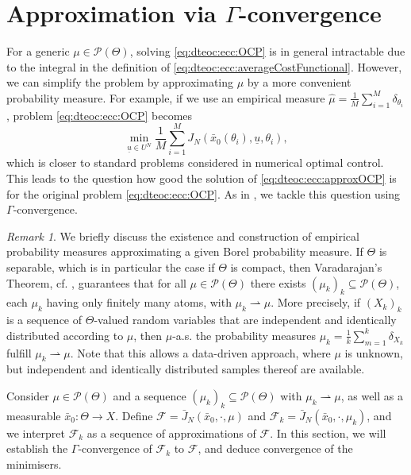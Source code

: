 \documentclass[letterpaper, 10 pt, conference]{IEEEconf}  %
\newcommand{\Pbs}{\mathcal{P}} %
\newcommand{\weak}{\rightharpoonup} %
\newcommand{\es}{\bar{x}} %
\newcommand{\is}[1]{{\underline{#1}}} %
\theoremstyle{theorem}
\theoremstyle{definition}
\theoremstyle{remark}
\newtheorem{remark}{Remark}
\begin{document}
\section{Approximation via $\Gamma$-convergence} \label{sec:ecc:gammaConv}
For a generic $\mu\in\Pbs(\Theta)$, solving \eqref{eq:dteoc:ecc:OCP} is in general intractable due to the integral in the definition of \eqref{eq:dteoc:ecc:averageCostFunctional}.
However, we can simplify the problem by approximating $\mu$ by a more convenient probability measure.
For example, if we use an empirical measure $\hat\mu=\frac1M \sum_{i=1}^M \delta_{\theta_i}$,
problem \eqref{eq:dteoc:ecc:OCP} becomes
\begin{equation} \label{eq:dteoc:ecc:approxOCP}
    \min_{\is{u}\in U^N} \frac1M \sum_{i=1}^M J_N(\es_0(\theta_i),\is{u},\theta_i),
\end{equation}
which is closer to standard problems considered in numerical optimal control.
This leads to the question how good the solution of \eqref{eq:dteoc:ecc:approxOCP} is for the original problem \eqref{eq:dteoc:ecc:OCP}.
As in \cite{scagliotti2023optimal}, we tackle this question using $\Gamma$-convergence.
\begin{remark}
We briefly discuss the existence and construction of empirical probability measures approximating a given Borel probability measure.
If $\Theta$ is separable, which is in particular the case if $\Theta$ is compact, then Varadarajan's Theorem, cf. \cite[Theorem~11.4.1]{dudley2002real}, guarantees that for all $\mu\in\Pbs(\Theta)$ there exists $(\mu_k)_k\subseteq\Pbs(\Theta)$, each $\mu_k$ having only finitely many atoms, with $\mu_k \weak \mu$.
More precisely, if $(X_k)_k$ is a sequence of $\Theta$-valued random variables that are independent and identically distributed according to $\mu$, then $\mu$-a.s. the probability measures $\mu_k = \frac1k \sum_{m=1}^k \delta_{X_k}$ fulfill $\mu_k \weak \mu$.
Note that this allows a data-driven approach, where $\mu$ is unknown, but independent and identically distributed samples thereof are available.
\end{remark}
Consider $\mu \in \Pbs(\Theta)$ and a sequence $(\mu_k)_k\subseteq\Pbs(\Theta)$ with $\mu_k\weak\mu$, as well as a measurable $\es_0: \Theta\rightarrow X$.
Define $\mathcal{F}=\bar J_N(\es_0,\cdot,\mu)$ and $\mathcal{F}_k=\bar J_N(\es_0,\cdot,\mu_k)$, and we interpret $\mathcal{F}_k$ as a sequence of approximations of $\mathcal{F}$.
In this section, we will establish the $\Gamma$-convergence of $\mathcal{F}_k$ to $\mathcal{F}$, and deduce convergence of the minimisers.
\end{document}
